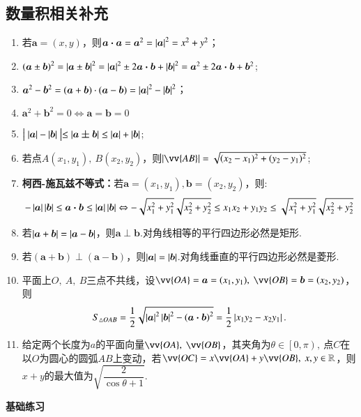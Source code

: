 \begin{Theorem}[平面向量基本定理]
  \subsection{数量积相关补充}
    \begin{enumerate}[label=\circled{\arabic*}]
      \item 若$\bm{a}=\left(x,y\right)$，则$ \bm{a}\bm{\cdot}\bm{a}=\bm{a}^2=\left| \bm{a} \right|^2=x^2+y^2 $；
      \item $ \left(\bm{a}\pm \bm{b}\right)^2=\left| \bm{a}\pm \bm{b} \right|^2=\left| \bm a \right|^2\pm2\bm{a}\bm{\cdot}\bm{b}+\left| \bm b \right|^2=\bm{a}^2\pm2\bm{a}\bm{\cdot}\bm{b}+\bm{b}^2$;
      \item $\bm a^2-\bm b^2=(\bm a+\bm b)\cdot(\bm a-\bm b)=\left| \bm a \right|^2-\left| \bm b \right|^2$；
      \item $\bm a^2+\bm b^2=0\Leftrightarrow \bm a=\bm b=0$
      \item $\bigm|\left| \bm{a} \right|-\left| \bm{b} \right|\bigm|\le\left| \bm{a\pm b} \right|\le\left| \bm{a} \right|+\left| \bm{b} \right|$;
      \item 若点$ A(x_1,y_1),~B(x_2,y_2) $，则$ \abs{\vv{AB}}=\sqrt{(x_2-x_1)^2+(y_2-y_1)^2} $;
      \item \textbf{柯西-施瓦兹不等式：}若$\bm{a}=\left(x_1,y_1\right),\bm{b}=\left(x_2,y_2\right)$，则:$$ -\left| \bm{a} \right|\left| \bm{b} \right|\le\bm{a}\bm{\cdot}\bm{b}\le\left| \bm{a} \right|\left| \bm{b} \right|\Leftrightarrow -\sqrt{x_1^2+y_1^2}\sqrt{x_2^2+y_2^2}\le x_1x_2+y_1y_2\le \sqrt{x_1^2+y_1^2}\sqrt{x_2^2+y_2^2}$$
      \item 若$ \left| \bm{a}+\bm{b} \right|=\left| \bm{a}-\bm{b} \right| $，则$ \bm{a}\perp\bm{b} $.对角线相等的平行四边形必然是矩形.
      \item 若$ \left(\bm{a}+\bm{b}\right)\perp\left(\bm{a}-\bm{b}\right) $，则$\left| \bm{a} \right|=\left| \bm{b} \right| $.对角线垂直的平行四边形必然是菱形.
      \item 平面上$ O,~A,~B $三点不共线，设$\vv{OA}=\bm{a}=(x_1,y_1) ,~\vv{OB}=\bm{b}=(x_2,y_2)$，则$$ S_{\triangle OAB}=\dfrac{1}{2}\sqrt{\left| \bm{a} \right|^2\left| \bm{b} \right|^2-\left(\bm{a}\bm{\cdot}\bm{b}\right)^2}=\dfrac{1}{2}\left| x_1y_2-x_2y_1 \right| .$$
      \item 给定两个长度为$ a $的平面向量$ \vv{OA},~\vv{OB} $，其夹角为$ \theta\in\left[0,\pi \right), ~$点$ C $在以$ O $为圆心的圆弧$ AB $上变动，若$ \vv{OC}=x\vv{OA}+y\vv{OB},~x,y\inR $，则$ x+y $的最大值为$ \sqrt{\dfrac{2}{\cos\theta+1}}. $
    \end{enumerate}
    \vspace{2cm}
  \begin{exercise}{{\textbf{基础练习}}}
    \item%

\end{exercise}
\end{Theorem}
